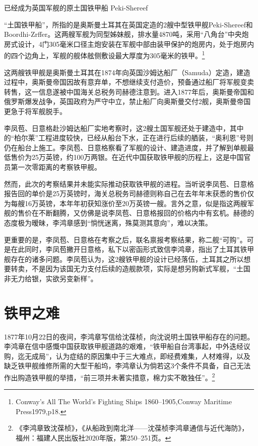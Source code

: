 \documentclass[12pt,UTF8]{ctexbook}
\begin{document}
已经成为英国军舰的原土国铁甲船 Peki-Shereef

“土国铁甲船”，所指的是奥斯曼土耳其在英国定造的2艘中型铁甲舰Peki-Shereef和 Boordhi-Zrffer。这两艘军舰为同型姊妹舰，排水量4870吨，采用“八角台”中央炮房式设计，4门305毫米口径主炮安装在军舰中部由装甲保护的炮房内，处于炮房内的四个边角上，军舰的舰体舷侧敷设最大厚度为305毫米的铁甲。\footnote{Conway's All The World's Fighting Ships 1860--1905,Conway Maritime Press1979,p18.}

这两艘铁甲舰是奥斯曼土耳其在1874年向英国沙姆达船厂（Samuda）定造，建造过程中，奥斯曼帝国因故有意弃单，不想继续支付造价，预备通过船厂将军舰变卖转售，这一信息遂被中国海关总税务司赫德注意到。进入1877年后，奥斯曼帝国和俄罗斯爆发战争，英国政府为严守中立，禁止船厂向奥斯曼交付2舰，奥斯曼帝国更急于将军舰脱手。

李凤苞、日意格赴沙姆达船厂实地考察时，这2艘土国军舰还处于建造中，其中的“柏尔莱”工程进度较快，已经从船台下水，正在进行后续的舾装，“奥利恩”号则仍在船台上施工。李凤苞、日意格察看了军舰的设计、建造进度，并了解到单舰最低售价为25万英镑，约100万两银。在近代中国获取铁甲舰的历程上，这是中国官员第一次零距离的考察铁甲舰。

然而，此次的考察结果并未能实际推动获取铁甲舰的进程。当听说李凤苞、日意格报告回的单价是25万英镑时，海关总税务司赫德则称自己在去年年末获悉的售价仅为每艘16万英镑，本年年初获知涨价至20万英镑一艘。言外之意，似是指这两艘军舰的售价在不断翻腾，又仿佛是说李凤苞、日意格报回的价格内中有玄机。赫德的态度极为暧昧，李鸿章感到“惝恍迷离，殊莫测其意向”，难以决策。

更重要的是，李凤苞、日意格在考察之后，联名禀报考察结果，称二舰“可购”。可是在此同时，李凤苞撇开日意格，私下以密函形式致信李鸿章，指出了土耳其铁甲舰存在的诸多问题。李凤苞认为，这2艘铁甲舰的设计已经落伍，土耳其之所以想要转卖，不是因为该国无力支付后续的造舰款项，实际是想另购新式军舰，“土国非无力给银，实欲另变新样”。

\section{铁甲之难}

1877年10月22日的夜间，李鸿章写信给沈葆桢，向沈说明土国铁甲船存在的问题。李鸿章在信中感慨中国获取铁甲舰道路的艰难，“铁甲船自台湾事起，中外迭经议购，迄无成局”，认为症结的原因集中于三大难点，即经费难集，人材难得，以及缺乏铁甲舰维修所需的大型干船坞，李鸿章认为倘若这3个条件不具备，自己无法作出购造铁甲舰的举措，“前三项并未著实措意，棉力实不敢独任”。\footnote{《李鸿章致沈葆桢》，《从船政到南北洋——沈葆桢李鸿章通信与近代海防》，福州：福建人民出版社2020年版，第250--251页。}
\end{document}
